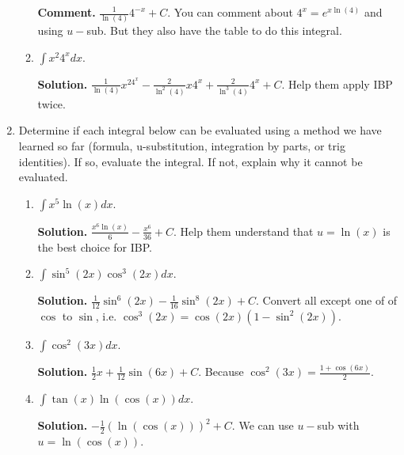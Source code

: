 \documentclass[12pt]{article}
\begin{document}
\begin{enumerate}
\begin{enumerate}
\textbf{Comment. }$\frac{1}{\ln(4)}4^{-x}+C$. You can comment about $4^x = e^{x\ln(4)}$ and using $u-$sub. But they also have the table to do this integral.

\item $\int x^2 4^xdx$.

\textbf{Solution. } $\frac{1}{\ln(4)}x^24^{x} - \frac{2}{\ln^2(4)}x4^x + \frac{2}{\ln^3(4)}4^x+C$. Help them apply IBP twice.

\end{enumerate}

\item Determine if each integral below can be evaluated using a method we have learned so
far (formula, u-substitution, integration by parts, or trig identities). If so, evaluate the
integral. If not, explain why it cannot be evaluated.

\begin{enumerate}

\item $\int x^5\ln(x)dx$.

\textbf{Solution. } $\frac{x^6\ln(x)}{6} - \frac{x^6}{36}+C$. Help them understand that $u=\ln(x)$ is the best choice for IBP. 

\item $\int \sin^5(2x)\cos^3(2x)dx$.

\textbf{Solution. }$\frac{1}{12}\sin^6(2x) - \frac{1}{16}\sin^8(2x)+C$. Convert all except one of of $\cos$ to $\sin$, i.e. $\cos^3(2x)=\cos(2x)(1-\sin^2(2x))$.  

\item $\int \cos^2(3x)dx$.

\textbf{Solution. }$\frac{1}{2}x + \frac{1}{12}\sin(6x)+C$. Because $\cos^2(3x) =\frac{1+\cos(6x)}{2} $.

\item $\int \tan(x)\ln(\cos(x))dx$.

\textbf{Solution. }$-\frac{1}{2}\left(\ln(\cos(x))\right)^2+C$. We can use $u-$sub with $u = \ln(\cos(x))$.
\end{enumerate}



\end{enumerate}
\end{document}
